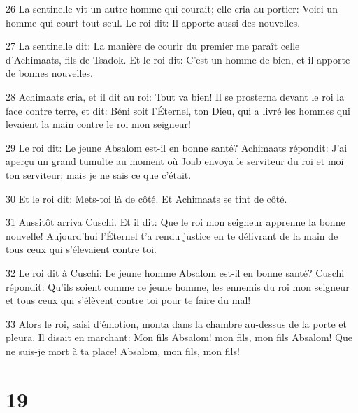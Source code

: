 \par 26 La sentinelle vit un autre homme qui courait; elle cria au portier: Voici un homme qui court tout seul. Le roi dit: Il apporte aussi des nouvelles.
\par 27 La sentinelle dit: La manière de courir du premier me paraît celle d'Achimaats, fils de Tsadok. Et le roi dit: C'est un homme de bien, et il apporte de bonnes nouvelles.
\par 28 Achimaats cria, et il dit au roi: Tout va bien! Il se prosterna devant le roi la face contre terre, et dit: Béni soit l'Éternel, ton Dieu, qui a livré les hommes qui levaient la main contre le roi mon seigneur!
\par 29 Le roi dit: Le jeune Absalom est-il en bonne santé? Achimaats répondit: J'ai aperçu un grand tumulte au moment où Joab envoya le serviteur du roi et moi ton serviteur; mais je ne sais ce que c'était.
\par 30 Et le roi dit: Mets-toi là de côté. Et Achimaats se tint de côté.
\par 31 Aussitôt arriva Cuschi. Et il dit: Que le roi mon seigneur apprenne la bonne nouvelle! Aujourd'hui l'Éternel t'a rendu justice en te délivrant de la main de tous ceux qui s'élevaient contre toi.
\par 32 Le roi dit à Cuschi: Le jeune homme Absalom est-il en bonne santé? Cuschi répondit: Qu'ils soient comme ce jeune homme, les ennemis du roi mon seigneur et tous ceux qui s'élèvent contre toi pour te faire du mal!
\par 33 Alors le roi, saisi d'émotion, monta dans la chambre au-dessus de la porte et pleura. Il disait en marchant: Mon fils Absalom! mon fils, mon fils Absalom! Que ne suis-je mort à ta place! Absalom, mon fils, mon fils!

\chapter{19}

